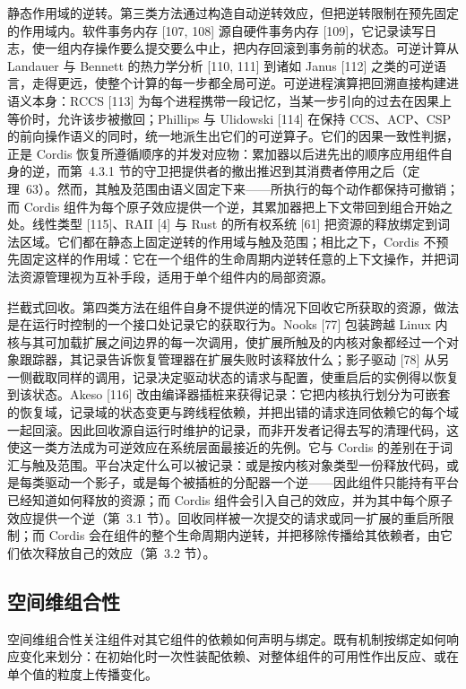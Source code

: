 \documentclass[
  10
]{article}
\begin{document}
静态作用域的逆转。第三类方法通过构造自动逆转效应，但把逆转限制在预先固定的作用域内。软件事务内存 {[}107, 108{]} 源自硬件事务内存 {[}109{]}，它记录读写日志，使一组内存操作要么提交要么中止，把内存回滚到事务前的状态。可逆计算从 Landauer 与 Bennett 的热力学分析 {[}110, 111{]} 到诸如 Janus {[}112{]} 之类的可逆语言，走得更远，使整个计算的每一步都全局可逆。可逆进程演算把回溯直接构建进语义本身：RCCS {[}113{]} 为每个进程携带一段记忆，当某一步引向的过去在因果上等价时，允许该步被撤回；Phillips 与 Ulidowski {[}114{]} 在保持 CCS、ACP、CSP 的前向操作语义的同时，统一地派生出它们的可逆算子。它们的因果一致性判据，正是 Cordis 恢复所遵循顺序的并发对应物：累加器以后进先出的顺序应用组件自身的逆，而第~4.3.1 节的守卫把提供者的撤出推迟到其消费者停用之后（定理~63）。然而，其触及范围由语义固定下来——所执行的每个动作都保持可撤销；而 Cordis 组件为每个原子效应提供一个逆，其累加器把上下文带回到组合开始之处。线性类型 {[}115{]}、RAII {[}4{]} 与 Rust 的所有权系统 {[}61{]} 把资源的释放绑定到词法区域。它们都在静态上固定逆转的作用域与触及范围；相比之下，Cordis 不预先固定这样的作用域：它在一个组件的生命周期内逆转任意的上下文操作，并把词法资源管理视为互补手段，适用于单个组件内的局部资源。

拦截式回收。第四类方法在组件自身不提供逆的情况下回收它所获取的资源，做法是在运行时控制的一个接口处记录它的获取行为。Nooks {[}77{]} 包装跨越 Linux 内核与其可加载扩展之间边界的每一次调用，使扩展所触及的内核对象都经过一个对象跟踪器，其记录告诉恢复管理器在扩展失败时该释放什么；影子驱动 {[}78{]} 从另一侧截取同样的调用，记录决定驱动状态的请求与配置，使重启后的实例得以恢复到该状态。Akeso {[}116{]} 改由编译器插桩来获得记录：它把内核执行划分为可嵌套的恢复域，记录域的状态变更与跨线程依赖，并把出错的请求连同依赖它的每个域一起回滚。因此回收源自运行时维护的记录，而非开发者记得去写的清理代码，这使这一类方法成为可逆效应在系统层面最接近的先例。它与 Cordis 的差别在于词汇与触及范围。平台决定什么可以被记录：或是按内核对象类型一份释放代码，或是每类驱动一个影子，或是每个被插桩的分配器一个逆——因此组件只能持有平台已经知道如何释放的资源；而 Cordis 组件会引入自己的效应，并为其中每个原子效应提供一个逆（第~3.1 节）。回收同样被一次提交的请求或同一扩展的重启所限制；而 Cordis 会在组件的整个生命周期内逆转，并把移除传播给其依赖者，由它们依次释放自己的效应（第~3.2 节）。

\subsection{空间维组合性} \label{spatial-composability-1}

空间维组合性关注组件对其它组件的依赖如何声明与绑定。既有机制按绑定如何响应变化来划分：在初始化时一次性装配依赖、对整体组件的可用性作出反应、或在单个值的粒度上传播变化。
\end{document}
